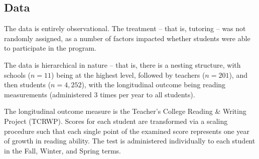 \documentclass[a0,landscape]{a0poster}
\begin{document}
\begin{multicols}{3}

\subsection*{Data}

The data is entirely observational.
The treatment -- that is, tutoring -- was not randomly assigned,
as a number of factors impacted whether students were able
to participate in the program.

The data is hierarchical in nature -- that is, there is a
nesting structure, with schools ($n=11$) being at the highest level,
followed by teachers ($n=201$), and then students ($n=4,252$),
with the longitudinal outcome being reading measurements
(administered 3 times per year to all students).

The longitudinal outcome measure is the
Teacher's College Reading \& Writing Project (TCRWP).
Scores for each student are transformed via a scaling procedure
such that each single point of the examined score represents
one year of growth in reading ability.
The test is administered individually to each student
in the Fall, Winter, and Spring terms.


\end{multicols}
\end{document}
